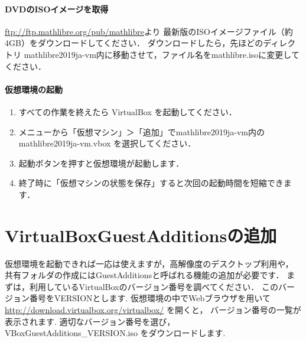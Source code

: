 \documentclass[a4j]{ltjsarticle}
\newcommand{\vm}{mathlibre2019ja-vm}
\begin{document}
\paragraph{DVDのISOイメージを取得}
\url{ftp://ftp.mathlibre.org/pub/mathlibre}より
最新版のISOイメージファイル（約4GB）をダウンロードしてください．
ダウンロードしたら，先ほどのディレクトリ \vm 内に移動させて，ファイル名をmathlibre.isoに変更してください．


\paragraph{仮想環境の起動}
\begin{enumerate}
 \item すべての作業を終えたら VirtualBox を起動してください．
 \item メニューから「仮想マシン」＞「追加」で\vm 内の \vm.vbox を選択してください．
 \item 起動ボタンを押すと仮想環境が起動します．
 \item 終了時に「仮想マシンの状態を保存」すると次回の起動時間を短縮できます．
\end{enumerate}

\section{VirtualBoxGuestAdditionsの追加}
仮想環境を起動できれば一応は使えますが，高解像度のデスクトップ利用や，
共有フォルダの作成にはGuestAdditionsと呼ばれる機能の追加が必要です．
まずは，利用しているVirtualBoxのバージョン番号を調べてください．
このバージョン番号をVERSIONとします. 
仮想環境の中でWebブラウザを用いて
\url{http://download.virtualbox.org/virtualbox/} を開くと，
バージョン番号の一覧が表示されます. 適切なバージョン番号を選び，
VBoxGuestAdditions\_VERSION.iso
をダウンロードします. 
\end{document}
